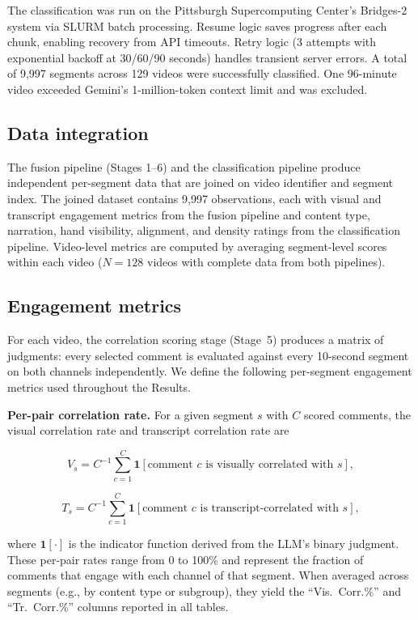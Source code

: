 \documentclass[fleqn,10pt]{wlscirep}
\begin{document}
The classification was run on the Pittsburgh Supercomputing Center's Bridges-2 system via SLURM batch processing. Resume logic saves progress after each chunk, enabling recovery from API timeouts. Retry logic (3 attempts with exponential backoff at 30/60/90 seconds) handles transient server errors. A total of 9{,}997 segments across 129 videos were successfully classified. One 96-minute video exceeded Gemini's 1-million-token context limit and was excluded.


\subsection*{Data integration}

The fusion pipeline (Stages 1--6) and the classification pipeline produce independent per-segment data that are joined on video identifier and segment index. The joined dataset contains 9{,}997 observations, each with visual and transcript engagement metrics from the fusion pipeline and content type, narration, hand visibility, alignment, and density ratings from the classification pipeline. Video-level metrics are computed by averaging segment-level scores within each video ($N = 128$ videos with complete data from both pipelines).


\subsection*{Engagement metrics}

For each video, the correlation scoring stage (Stage~5) produces a matrix of judgments: every selected comment is evaluated against every 10-second segment on both channels independently. We define the following per-segment engagement metrics used throughout the Results.

\textbf{Per-pair correlation rate.}
For a given segment $s$ with $C$ scored comments, the visual correlation rate and
transcript correlation rate are

\[
V_s = C^{-1}\sum_{c=1}^{C} \mathbf{1}[\text{comment } c \text{ is visually correlated with } s],
\]

\[
T_s = C^{-1}\sum_{c=1}^{C} \mathbf{1}[\text{comment } c \text{ is transcript-correlated with } s],
\]

where $\mathbf{1}[\cdot]$ is the indicator function derived from the LLM's binary judgment.
These per-pair rates range from 0 to 100\% and represent the fraction of comments that
engage with each channel of that segment. When averaged across segments (e.g., by content
type or subgroup), they yield the “Vis.\ Corr.\%” and “Tr.\ Corr.\%” columns reported in all tables.
\end{document}
